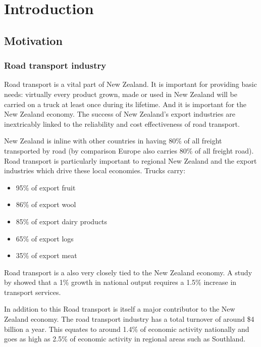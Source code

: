 
\chapter{Introduction}


\section{Motivation}

\subsection{Road transport industry}

Road transport is a vital part of New Zealand. It is important for providing basic needs: virtually every product grown, made or used in New Zealand will be carried on a truck at least once during its lifetime\cite{RTFNZ}. And it is important for the New Zealand economy. The success of New Zealand's export industries are inextricably linked to the reliability and cost effectiveness of road transport.

New Zealand is inline with other countries in having 80\% of all freight transported by road (by comparison Europe also carries 80\% of all freight road). Road transport is particularly important to regional New Zealand and the export industries which drive these local economies. Trucks carry\cite{RTFNZ}:
\begin{itemize}
	\item 95\% of export fruit
	\item 86\% of export wool
	\item 85\% of export dairy products
	\item 65\% of export logs
	\item 35\% of export meat
\end{itemize}

Road transport is a also very closely tied to the New Zealand economy. A study by \cite{?} showed that a 1\% growth in national output requires a 1.5\% increase in transport services.

In addition to this Road transport is itself a major contributor to the New Zealand economy. The road transport industry has a total turnover of around \$4 billion a year. This equates to around 1.4\% of economic activity nationally and goes as high as 2.5\% of economic activity in regional areas such as Southland\cite{RTFNZ}.

